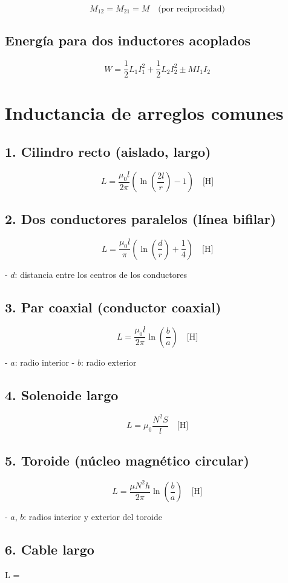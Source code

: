 \documentclass[11pt]{article}
\begin{document}
\begin{multicols}{2}
\[
\boxed{M_{12} = M_{21} = M}
\quad\text{(por reciprocidad)}
\]

\subsection*{Energía para dos inductores acoplados}

\[
W = \frac{1}{2} L_1 I_1^2 + \frac{1}{2} L_2 I_2^2 \pm M I_1 I_2
\]

\section*{Inductancia de arreglos comunes}

\subsection*{1. Cilindro recto (aislado, largo)}

\[
L = \frac{\mu_0 l}{2\pi} \left( \ln\left( \frac{2l}{r} \right) - 1 \right)
\quad\text{[H]}
\]


\subsection*{2. Dos conductores paralelos (línea bifilar)}

\[
L = \frac{\mu_0 l}{\pi} \left( \ln\left( \frac{d}{r} \right) + \frac{1}{4} \right)
\quad\text{[H]}
\]

- \( d \): distancia entre los centros de los conductores  

\subsection*{3. Par coaxial (conductor coaxial)}

\[
L = \frac{\mu_0 l}{2\pi} \ln\left( \frac{b}{a} \right)
\quad\text{[H]}
\]

- \( a \): radio interior  
- \( b \): radio exterior  

\subsection*{4. Solenoide largo}

\[
L = \mu_0 \frac{N^2 S}{l}
\quad\text{[H]}
\]


\subsection*{5. Toroide (núcleo magnético circular)}

\[
L = \frac{\mu N^2 h}{2\pi} \ln\left( \frac{b}{a} \right)
\quad\text{[H]}
\]

- \( a \), \( b \): radios interior y exterior del toroide  


\subsection*{6. Cable largo}

L = 

\end{multicols}
\end{document}
